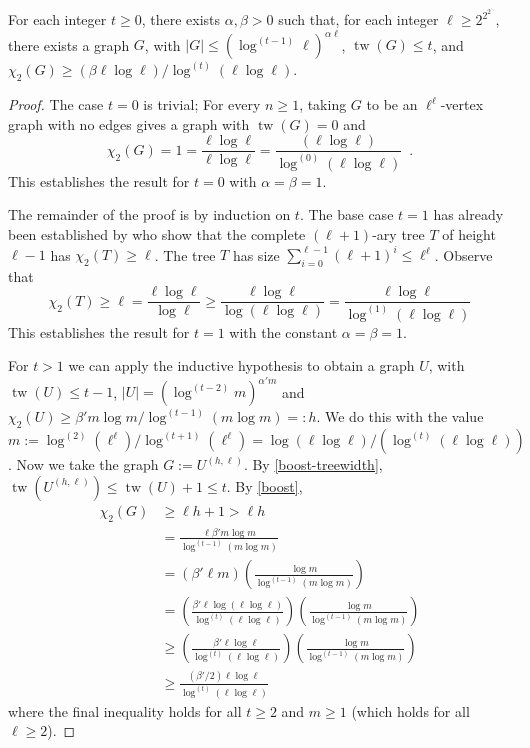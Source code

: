 \documentclass[kpfonts]{patmorin}
\DeclareMathOperator{\tw}{tw}
\newcommand{\uqs}{\chi_2}
\begin{document}
\begin{thm}\label{treewidth-lower-bound}
    For each integer $t\ge 0$, there exists $\alpha,\beta>0$
    such that, for each integer $\ell\ge 2^{2^{2^{\ddots}}}$, there exists a graph $G$, with $|G|\le (\log^{(t-1)}\ell)^{\alpha\ell}$, $\tw(G)\le t$, and $\uqs(G)\ge (\beta\ell\log\ell)/\log^{(t)}(\ell\log\ell)$.
\end{thm}

\begin{proof}
    The case $t=0$ is trivial; For every $n\ge 1$, taking $G$ to be an $\ell^\ell$-vertex graph with no edges gives a graph with $\tw(G)=0$ and
    \[
        \uqs(G)=1=\frac{\ell\log \ell}{\ell\log\ell} = \frac{(\ell\log \ell)}{\log^{(0)}(\ell\log\ell)} \enspace .
    \]
    This establishes the result for $t=0$ with $\alpha=\beta=1$.

    The remainder of the proof is by induction on $t$.  The base case $t=1$ has already been established by \citet{karpas.neiman.ea:on} who show that the complete $(\ell+1)$-ary tree $T$ of height $\ell-1$ has $\uqs(T)\ge \ell$.  The tree $T$ has size $\sum_{i=0}^{\ell-1} (\ell+1)^i \le \ell^\ell$.
    Observe that
    \[
        \uqs(T) \ge \ell = \frac{\ell\log\ell}{\log\ell} \ge \frac{\ell\log\ell}{\log(\ell\log\ell)} = \frac{\ell \log \ell}{\log^{(1)}(\ell\log\ell)}
    \]
    This establishes the result for $t=1$ with the constant $\alpha=\beta=1$.

    For $t>1$ we can apply the inductive hypothesis to obtain a graph $U$, with $\tw(U)\le t-1$, $|U|=(\log^{(t-2)}m)^{\alpha'm}$ and $\uqs(U)\ge \beta' m\log m/\log^{(t-1)}(m\log m)=:h$.
    We do this with the value $m:=\log^{(2)}(\ell^\ell)/\log^{(t+1)}(\ell^\ell)=\log (\ell\log\ell)/(\log^{(t)}(\ell\log\ell))$.  Now we take the graph $G:=U^{(h,\ell)}$.  By \cref{boost-treewidth}, $\tw(U^{(h,\ell)})\le \tw(U)+1\le t$.  By \cref{boost},
    \begin{align*}
       \uqs(G) & \ge \ell h+1 > \ell h\\
               & = \frac{\ell \beta' m\log m}{\log^{(t-1)}(m\log m)} \\
               & = \left(\beta'\ell m\right)\left(\frac{\log m}{\log^{(t-1)}(m\log m)}\right) \\
               & = \left(\frac{\beta'\ell \log(\ell\log\ell)}{\log^{(t)}(\ell\log\ell)}\right)\left(\frac{\log m}{\log^{(t-1)}(m\log m)}\right) \\
               & \ge \left(\frac{\beta'\ell \log\ell}{\log^{(t)}(\ell\log\ell)}\right) \left(\frac{\log m}{\log^{(t-1)}(m\log m)}\right) \\
               & \ge \frac{(\beta'/2)\ell \log\ell}{\log^{(t)}(\ell\log\ell)}
   \end{align*}
   where the final inequality holds for all $t\ge 2$ and $m\ge 1$ (which holds for all $\ell\ge 2$).


\end{proof}
\end{document}
